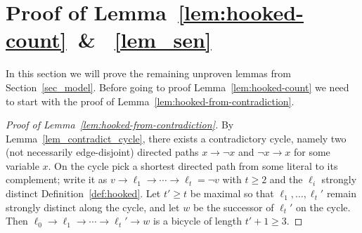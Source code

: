 \documentclass[11pt,reqno]{amsart}
\numberwithin{equation}{section}
\newcommand\Lem{Lemma}
\newcommand\Def{Definition}
\newcommand\Sec{Section}
\begin{document}
    \section{Proof of \Lem~\ref{lem:hooked-count}~\&~ \ref{lem_sen}}\label{sec_prooflemma}
    In this section we will prove the remaining unproven lemmas from \Sec~\ref{sec_model}.
    Before going to proof \Lem~\ref{lem:hooked-count} we need to start with the proof of \Lem~\ref{lem:hooked-from-contradiction}.
    \begin{proof}[Proof of \Lem~\ref{lem:hooked-from-contradiction}]
    By Lemma~\ref{lem_contradict_cycle}, there exists a contradictory cycle, namely two (not necessarily edge-disjoint) directed paths
    \(x\to\neg x\) and \(\neg x\to x\) for some variable \(x\).
    On the cycle pick a shortest directed path from some literal to its complement; write it as
    \(v\to \ell_1\to\cdots\to \ell_t=\neg v\) with $t\ge 2$ and the $\ell_i$ strongly distinct \Def~\ref{def:hooked}.
    Let $t'\ge t$ be maximal so that \(\ell_1,\ldots,\ell_t'\) remain strongly distinct along the cycle,
    and let \(w\) be the successor of \(\ell_t'\) on the cycle.
    Then \(\ell_0\to \ell_1\to\cdots\to \ell_t'\to w\) is a bicycle of length $t'+1\ge 3$.
    \end{proof}
\end{document}
